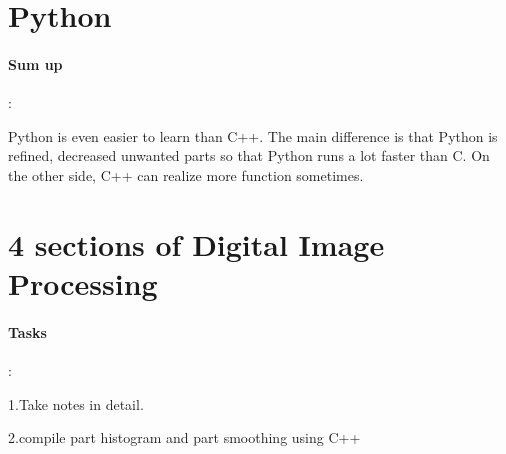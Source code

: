 \documentclass{report}
\begin{document}
\section{Python}
	\paragraph{Sum up}:\par
	Python is even easier to learn than C++. The main difference is that Python is refined, decreased unwanted parts so that Python runs a lot faster than C. On the other side, C++ can realize more function sometimes. 
\section{4 sections of Digital Image Processing}
	\paragraph{Tasks}:\par 
	1.Take notes in detail.\par 
	2.compile part histogram and part smoothing using C++
\end{document}
